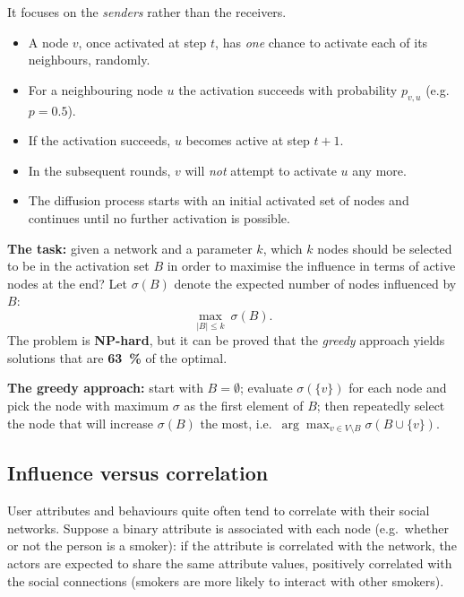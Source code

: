 \documentclass[11pt,a4paper]{article}
\theoremstyle{definition}
\begin{document}
\begin{defbox}
It focuses on the \emph{senders} rather than the receivers.
\begin{itemize}
\item A node $v$, once activated at step $t$, has \emph{one} chance to activate each of its
      neighbours, randomly.
\item For a neighbouring node $u$ the activation succeeds with probability $p_{v,u}$ (e.g.\
      $p=0.5$).
\item If the activation succeeds, $u$ becomes active at step $t+1$.
\item In the subsequent rounds, $v$ will \emph{not} attempt to activate $u$ any more.
\item The diffusion process starts with an initial activated set of nodes and continues until no
      further activation is possible.
\end{itemize}
\end{defbox}

\begin{defbox}
\textbf{The task:} given a network and a parameter $k$, which $k$ nodes should be selected to be in
the activation set $B$ in order to maximise the influence in terms of active nodes at the end? Let
$\sigma(B)$ denote the expected number of nodes influenced by $B$:
\[ \max_{|B|\le k}\ \sigma(B). \]
The problem is \textbf{NP-hard}, but it can be proved that the \emph{greedy} approach yields
solutions that are \textbf{63~\%} of the optimal.

\textbf{The greedy approach:} start with $B=\emptyset$; evaluate $\sigma(\{v\})$ for each node and
pick the node with maximum $\sigma$ as the first element of $B$; then repeatedly select the node
that will increase $\sigma(B)$ the most, i.e.\ $\arg\max_{v\in V\setminus B}\sigma(B\cup\{v\})$.
\end{defbox}

\subsection{Influence versus correlation}

User attributes and behaviours quite often tend to correlate with their social networks. Suppose a
binary attribute is associated with each node (e.g.\ whether or not the person is a smoker): if the
attribute is correlated with the network, the actors are expected to share the same attribute values,
positively correlated with the social connections (smokers are more likely to interact with other
smokers).
\end{document}

